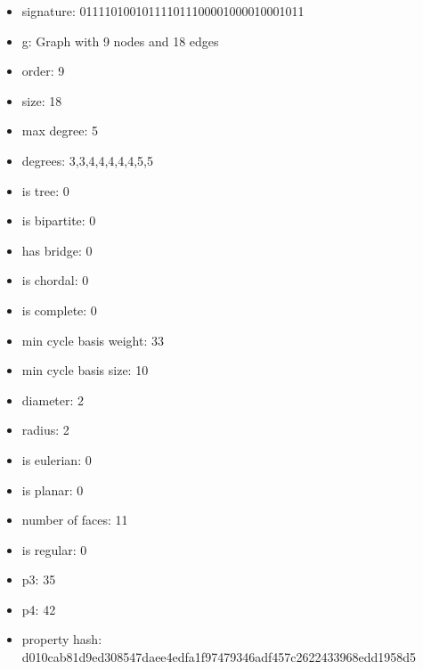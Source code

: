 \newpage
\begin{figure}
\end{figure}
\begin{itemize}
\item signature: 011110100101111011100001000010001011
\item g: Graph with 9 nodes and 18 edges
\item order: 9
\item size: 18
\item max degree: 5
\item degrees: 3,3,4,4,4,4,4,5,5
\item is tree: 0
\item is bipartite: 0
\item has bridge: 0
\item is chordal: 0
\item is complete: 0
\item min cycle basis weight: 33
\item min cycle basis size: 10
\item diameter: 2
\item radius: 2
\item is eulerian: 0
\item is planar: 0
\item number of faces: 11
\item is regular: 0
\item p3: 35
\item p4: 42
\item property hash: d010cab81d9ed308547daee4edfa1f97479346adf457c2622433968edd1958d5
\end{itemize}
